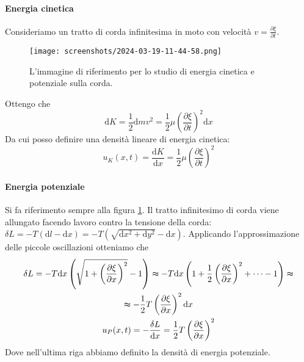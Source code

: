 \paragraph{Energia cinetica}
Consideriamo un tratto di corda infinitesima in moto con velocità \(v=\frac{\partial \xi }{\partial t} \). 
\begin{figure}[H]
	\centering
	\texttt{[image: screenshots/2024-03-19-11-44-58.png]}
	\caption{L'immagine di riferimento per lo studio di energia cinetica e potenziale sulla corda.}
	\label{fig:energia-corda}
\end{figure}
Ottengo che 
\[
	\mathrm{d} K = \frac{1}{2} \mathrm{d} m v ^{2} = \frac{1}{2} \mu \left( \frac{\partial \xi }{\partial t}  \right) ^{2} \mathrm{d} x
\]
Da cui posso definire una densità lineare di energia cinetica:
\[
	u_K(x,t) = \frac{\mathrm{d}K}{\mathrm{d}x} = \frac{1}{2} \mu \left( \frac{\partial \xi }{\partial t}  \right) ^{2} 
\]

\paragraph{Energia potenziale}

Si fa riferimento sempre alla figura \ref{fig:energia-corda}. Il tratto infinitesimo di corda viene allungato facendo lavoro contro la tensione della corda: \(\delta L = -T (\mathrm{d}l - \mathrm{d} x ) = -T(\sqrt{\mathrm{d}x^{2} + \mathrm{d} y ^{2}   } - \mathrm{d} x )\). Applicando l'approssimazione delle piccole oscillazioni otteniamo che
\begin{gather*}
	\delta L = -T \mathrm{d} x \left( \sqrt{1+ \left( \frac{\partial \xi }{\partial x}  \right)^{2}  } -1  \right) \thickapprox -T \mathrm{d} x \left( 1+\frac{1}{2} \left( \frac{\partial \xi }{\partial x}  \right)^{2} + \cdots - 1  \right) \thickapprox \\
	\thickapprox -\frac{1}{2}T \left( \frac{\partial \xi }{\partial x}  \right)^{2} \mathrm{d} x\\
	u_P(x,t) = -\frac{\delta L}{\mathrm{d} x} = \frac{1}{2}T\left( \frac{\partial \xi }{\partial x}  \right) ^{2} 
\end{gather*}
Dove nell'ultima riga abbiamo definito la densità di energia potenziale.

